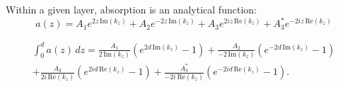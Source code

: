 \documentclass[12pt]{article}
\numberwithin{equation}{section}
\begin{document}
 
 
 Within a given layer, absorption is an analytical function:
\begin{equation}
a(z) = A_1 e^{2z \, \text{Im}(k_z)} + A_2 e^{-2z \, \text{Im}(k_z)} + A_3 e^{2iz \, \text{Re}(k_z)} + A_3^* e^{-2iz \, \text{Re}(k_z)}
\end{equation}

 
\begin{align}
\int_0^d a(z) \, dz = \frac{A_1}{2 \, \text{Im}(k_z)} \left( e^{2d \, \text{Im}(k_z)} - 1 \right)
+ \frac{A_2}{-2 \, \text{Im}(k_z)} \left( e^{-2d \, \text{Im}(k_z)} - 1 \right) \\
+ \frac{A_3}{2i \, \text{Re}(k_z)} \left( e^{2id \, \text{Re}(k_z)} - 1 \right)
+ \frac{A_3^*}{-2i \, \text{Re}(k_z)} \left( e^{-2id \, \text{Re}(k_z)} - 1 \right).
\end{align}

 
 








\end{document}
